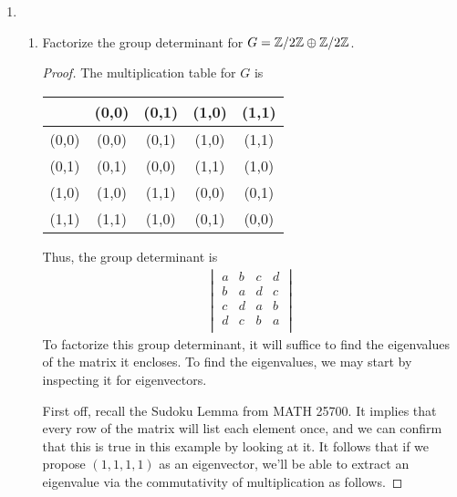 \documentclass[../psets.tex]{subfiles}
\begin{document}
\begin{enumerate}
\begin{enumerate}
    \end{enumerate}
    \item 
    \begin{enumerate}
        \item Factorize the group determinant for $G=\mathbb{Z}/2\mathbb{Z}\oplus\mathbb{Z}/2\mathbb{Z}$.
        \begin{proof}
            The multiplication table for $G$ is
            \begin{center}
                \small
                \renewcommand{\arraystretch}{1.2}
                \begin{tabular}{c|c|c|c|c|}
                          & (0,0) & (0,1) & (1,0) & (1,1)\\ \hline
                    (0,0) & (0,0) & (0,1) & (1,0) & (1,1)\\ \hline
                    (0,1) & (0,1) & (0,0) & (1,1) & (1,0)\\ \hline
                    (1,0) & (1,0) & (1,1) & (0,0) & (0,1)\\ \hline
                    (1,1) & (1,1) & (1,0) & (0,1) & (0,0)\\ \hline
                \end{tabular}
            \end{center}
            Thus, the group determinant is
            \begin{align*}
                \begin{vmatrix}
                    a & b & c & d\\
                    b & a & d & c\\
                    c & d & a & b\\
                    d & c & b & a\\
                \end{vmatrix}
            \end{align*}
            To factorize this group determinant, it will suffice to find the eigenvalues of the matrix it encloses. To find the eigenvalues, we may start by inspecting it for eigenvectors.\par
            First off, recall the Sudoku Lemma from MATH 25700. It implies that every row of the matrix will list each element once, and we can confirm that this is true in this example by looking at it. It follows that if we propose $(1,1,1,1)$ as an eigenvector, we'll be able to extract an eigenvalue via the commutativity of multiplication as follows.

\end{proof}
\end{enumerate}
\end{enumerate}
\end{document}
